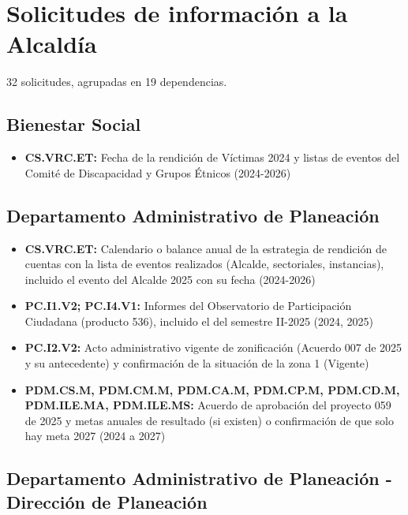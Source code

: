 \documentclass[11pt,letterpaper]{article}
\begin{document}
\section{Solicitudes de información a la Alcaldía}

\begingroup\sloppy

32 solicitudes, agrupadas en 19 dependencias.

\subsection*{Bienestar Social}

\begin{itemize}

\item \textbf{CS.VRC.ET:} Fecha de la rendición de Víctimas 2024 y listas de eventos del Comité de Discapacidad y Grupos Étnicos (2024-2026)

\end{itemize}

\subsection*{Departamento Administrativo de Planeación}

\begin{itemize}

\item \textbf{CS.VRC.ET:} Calendario o balance anual de la estrategia de rendición de cuentas con la lista de eventos realizados (Alcalde, sectoriales, instancias), incluido el evento del Alcalde 2025 con su fecha (2024-2026)

\item \textbf{PC.I1.V2; PC.I4.V1:} Informes del Observatorio de Participación Ciudadana (producto 536), incluido el del semestre II-2025 (2024, 2025)

\item \textbf{PC.I2.V2:} Acto administrativo vigente de zonificación (Acuerdo 007 de 2025 y su antecedente) y confirmación de la situación de la zona 1 (Vigente)

\item \textbf{PDM.CS.M, PDM.CM.M, PDM.CA.M, PDM.CP.M, PDM.CD.M, PDM.ILE.MA, PDM.ILE.MS:} Acuerdo de aprobación del proyecto 059 de 2025 y metas anuales de resultado (si existen) o confirmación de que solo hay meta 2027 (2024 a 2027)

\end{itemize}

\subsection*{Departamento Administrativo de Planeación - Dirección de Planeación}
\end{document}
